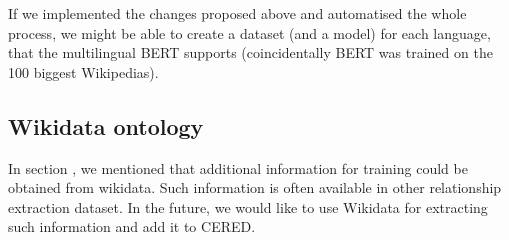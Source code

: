 If we implemented the changes proposed above and automatised the whole process, we might be able to create a dataset (and a model) for each language, that the multilingual BERT supports (coincidentally BERT was trained on the 100 biggest Wikipedias).

\subsection{Wikidata ontology}
In section , we mentioned that additional information for training could be obtained from wikidata. Such information is often available in other relationship extraction dataset. In the future, we would like to use Wikidata for extracting such information and add it to CERED.


